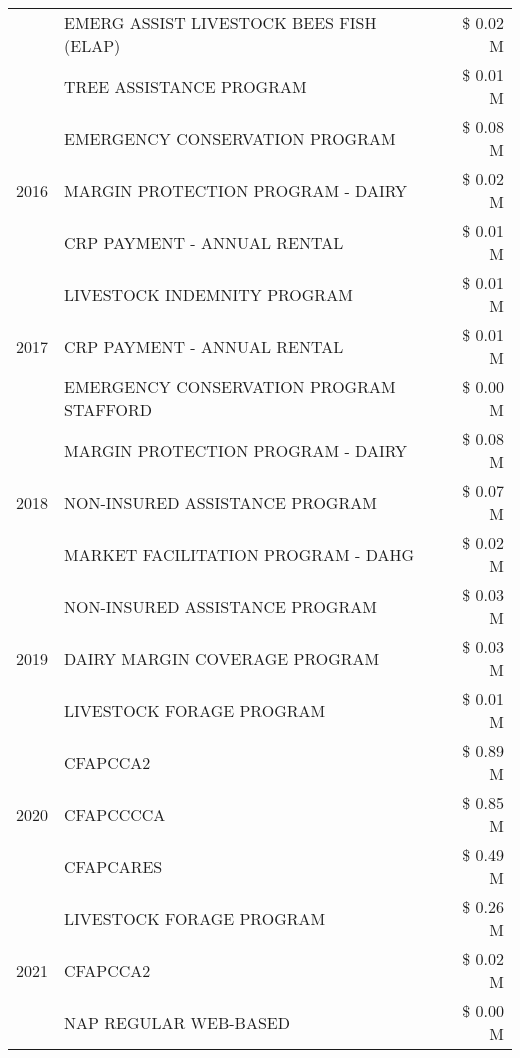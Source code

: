 \begin{tabular}{llr}
 & EMERG ASSIST LIVESTOCK BEES FISH (ELAP) & \$ 0.02 M \\
 & TREE ASSISTANCE PROGRAM & \$ 0.01 M \\
\cline{1-3}
\multirow[t]{3}{*}{2016} & EMERGENCY CONSERVATION PROGRAM & \$ 0.08 M \\
 & MARGIN PROTECTION PROGRAM - DAIRY & \$ 0.02 M \\
 & CRP PAYMENT - ANNUAL RENTAL & \$ 0.01 M \\
\cline{1-3}
\multirow[t]{3}{*}{2017} & LIVESTOCK INDEMNITY PROGRAM & \$ 0.01 M \\
 & CRP PAYMENT - ANNUAL RENTAL & \$ 0.01 M \\
 & EMERGENCY CONSERVATION PROGRAM STAFFORD & \$ 0.00 M \\
\cline{1-3}
\multirow[t]{3}{*}{2018} & MARGIN PROTECTION PROGRAM - DAIRY & \$ 0.08 M \\
 & NON-INSURED ASSISTANCE PROGRAM & \$ 0.07 M \\
 & MARKET FACILITATION PROGRAM - DAHG & \$ 0.02 M \\
\cline{1-3}
\multirow[t]{3}{*}{2019} & NON-INSURED ASSISTANCE PROGRAM & \$ 0.03 M \\
 & DAIRY MARGIN COVERAGE PROGRAM & \$ 0.03 M \\
 & LIVESTOCK FORAGE PROGRAM & \$ 0.01 M \\
\cline{1-3}
\multirow[t]{3}{*}{2020} & CFAPCCA2 & \$ 0.89 M \\
 & CFAPCCCCA & \$ 0.85 M \\
 & CFAPCARES & \$ 0.49 M \\
\cline{1-3}
\multirow[t]{3}{*}{2021} & LIVESTOCK FORAGE PROGRAM & \$ 0.26 M \\
 & CFAPCCA2 & \$ 0.02 M \\
 & NAP REGULAR WEB-BASED & \$ 0.00 M \\
\cline{1-3}
\bottomrule
\end{tabular}
